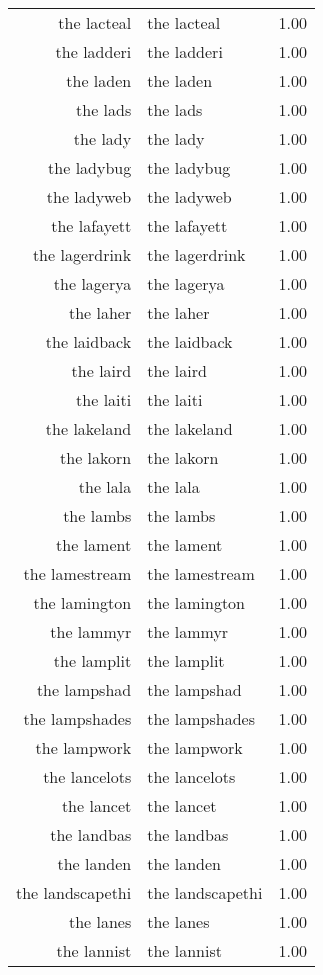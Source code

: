 \begin{table}[ht]
\begin{tabular}{rlr}
  the lacteal & the lacteal & 1.00 \\ 
  the ladderi & the ladderi & 1.00 \\ 
  the laden & the laden & 1.00 \\ 
  the lads & the lads & 1.00 \\ 
  the lady & the lady & 1.00 \\ 
  the ladybug & the ladybug & 1.00 \\ 
  the ladyweb & the ladyweb & 1.00 \\ 
  the lafayett & the lafayett & 1.00 \\ 
  the lagerdrink & the lagerdrink & 1.00 \\ 
  the lagerya & the lagerya & 1.00 \\ 
  the laher & the laher & 1.00 \\ 
  the laidback & the laidback & 1.00 \\ 
  the laird & the laird & 1.00 \\ 
  the laiti & the laiti & 1.00 \\ 
  the lakeland & the lakeland & 1.00 \\ 
  the lakorn & the lakorn & 1.00 \\ 
  the lala & the lala & 1.00 \\ 
  the lambs & the lambs & 1.00 \\ 
  the lament & the lament & 1.00 \\ 
  the lamestream & the lamestream & 1.00 \\ 
  the lamington & the lamington & 1.00 \\ 
  the lammyr & the lammyr & 1.00 \\ 
  the lamplit & the lamplit & 1.00 \\ 
  the lampshad & the lampshad & 1.00 \\ 
  the lampshades & the lampshades & 1.00 \\ 
  the lampwork & the lampwork & 1.00 \\ 
  the lancelots & the lancelots & 1.00 \\ 
  the lancet & the lancet & 1.00 \\ 
  the landbas & the landbas & 1.00 \\ 
  the landen & the landen & 1.00 \\ 
  the landscapethi & the landscapethi & 1.00 \\ 
  the lanes & the lanes & 1.00 \\ 
  the lannist & the lannist & 1.00 \\ 

\end{tabular}
\end{table}
